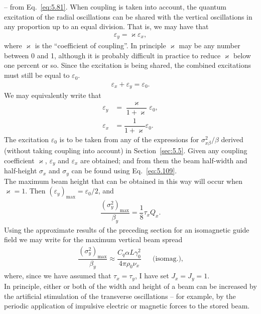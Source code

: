 -- from Eq.~\eqref{eq:5.81}. When coupling is taken into account, the quantum excitation of the radial oscillations can be shared with the vertical oscillations in any proportion up to an equal division. That is, we may have that
\begin{align}
	\varepsilon_y = \varkappa \varepsilon_x,
\end{align}
where $\varkappa$ is the ``coefficient of coupling''. In principle $\varkappa$ may be any number between
0 and 1, although it is probably difficult in practice to reduce $\varkappa$ below one percent or so. Since the excitation is being shared, the combined excitations must still be equal to $\varepsilon_0$.
\begin{align}
	\varepsilon_x + \varepsilon_y = \varepsilon_0.
\end{align}
We may equivalently write that
\begin{align}
	\varepsilon_y &= \dfrac{\varkappa}{1+\varkappa}\varepsilon_0,\\
    \varepsilon_x &= \dfrac{1}{1+\varkappa}\varepsilon_0.
\end{align}
The excitation $\varepsilon_0$ is to be taken from any of the expressions for $\sigma_{x\beta}^2/\beta$ derived (without taking coupling into account) in Section~\ref{sec:5.5}. Given any coupling coefficient $\varkappa$, $\varepsilon_y$ and $\varepsilon_x$ are obtained; and from them the beam half-width and half-height $\sigma_x$ and $\sigma_y$ can be found using Eq.~\eqref{eq:5.109}.\\
The maximum beam height that can be obtained in this way will occur when $\varkappa = 1$. Then $(\varepsilon_y)_\text{max} = \varepsilon_0/2$, and
\begin{align}
	\dfrac{(\sigma_y^2)_\text{max}}{\beta_y} = \dfrac{1}{8} \tau_x Q_x.
\end{align}
Using the approximate results of the preceding section for an isomagnetic guide field we may write for the maximum vertical beam spread
\begin{align}
	\dfrac{(\sigma_y^2)_\text{max}}{\beta_y} \approx \dfrac{C_q \alpha L \gamma_0^2}{4\pi\rho_0\nu_x} && \text{(isomag.)},
\end{align}
where, since we have assumed that $\tau_x = \tau_y$, I have set $J_x = J_y = 1$.\\
In principle, either or both of the width and height of a beam can be increased by the artificial stimulation of the transverse oscillations -- for example, by the periodic application of impulsive electric or magnetic forces to the stored beam.
